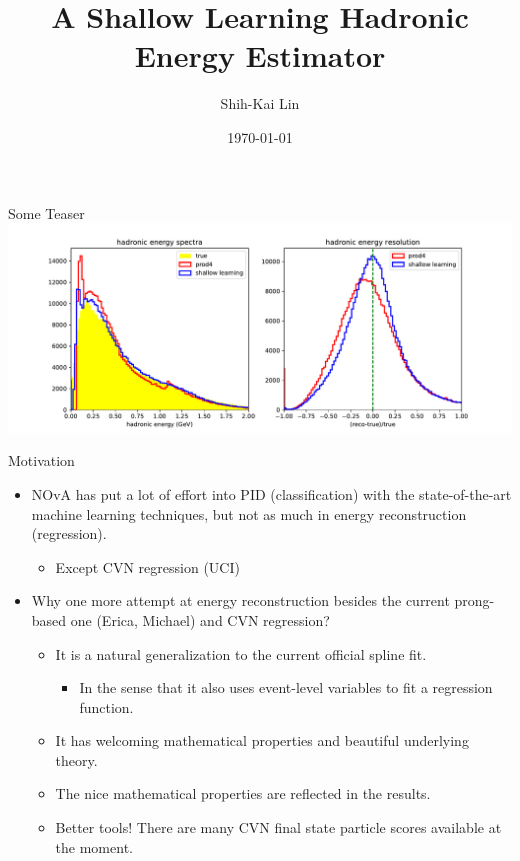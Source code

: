 \documentclass[aspectratio=169]{beamer}
\title{A Shallow Learning Hadronic Energy Estimator}
\date[today]{\today}
\author{Shih-Kai Lin}
\institute{Colorado State University}
\begin{document}
\begin{frame}
\titlepage
\end{frame}




\begin{frame}{Some Teaser}
  \centering
  \includegraphics[width=\textwidth]{figures/ehad_spec_res_side_by_side.pdf}
\end{frame}

\begin{frame}{Motivation}
  \begin{itemize}
    \item NOvA has put a lot of effort into PID (classification) with the state-of-the-art machine learning techniques, but not as much in energy reconstruction (regression).
    \begin{itemize}
      \item Except CVN regression (UCI)
    \end{itemize}
    \item Why one more attempt at energy reconstruction besides the current prong-based one (Erica, Michael) and CVN regression?
    \begin{itemize}
      \item It is a natural generalization to the current official spline fit.
      \begin{itemize}
        \item In the sense that it also uses event-level variables to fit a regression function.
      \end{itemize}
      \item It has welcoming mathematical properties and beautiful underlying theory.
      \item The nice mathematical properties are reflected in the results.
      \item Better tools! There are many CVN final state particle scores available at the moment.
    \end{itemize}
  \end{itemize}
\end{frame}
\end{document}

